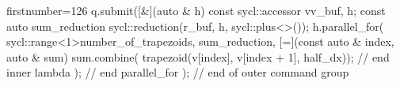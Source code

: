 \begin{cppcode*}{firstnumber=126}
        q.submit([&](auto & h) {
          const sycl::accessor v{v_buf, h};
          const auto sum_reduction{
            sycl::reduction(r_buf, h, sycl::plus<>())};
          h.parallel_for(
            sycl::range<1>{number_of_trapezoids}, 
            sum_reduction, 
            [=](const auto & index, auto & sum) {
              sum.combine(
                trapezoid(v[index], v[index + 1], half_dx));
            } // end inner lambda
          ); // end parallel_for
        }); // end of outer command group
\end{cppcode*}

